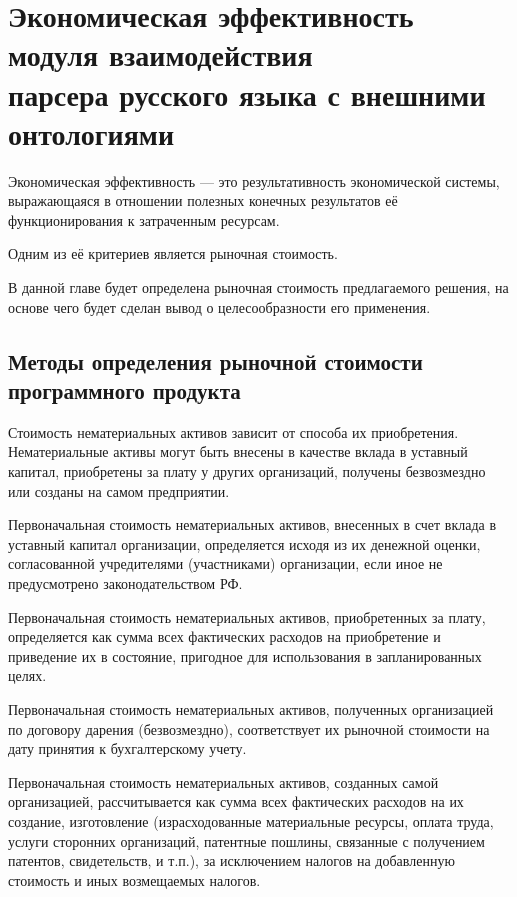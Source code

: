 \indent \section[Экономическая эффективность модуля взаимодействия парсера русского языка с внешними онтологиями]{Экономическая эффективность модуля взаимодействия \\парсера русского языка с внешними онтологиями}

Экономическая эффективность --- это результативность экономической системы, выражающаяся в отношении полезных конечных результатов её функционирования к затраченным ресурсам.

Одним из её критериев является рыночная стоимость.

В данной главе будет определена рыночная стоимость предлагаемого решения, на основе чего будет сделан вывод о целесообразности его применения.

\subsection{Методы определения рыночной стоимости программного продукта}

Стоимость нематериальных активов зависит от способа их приобретения. Нематериальные активы могут быть внесены в качестве вклада в уставный капитал, приобретены за плату у других организаций, получены безвозмездно или созданы на самом предприятии.

Первоначальная стоимость нематериальных активов, внесенных в счет вклада в уставный капитал организации, определяется исходя из их денежной оценки, согласованной учредителями (участниками) организации, если иное не предусмотрено законодательством РФ.

Первоначальная стоимость нематериальных активов, приобретенных за плату, определяется как сумма всех фактических расходов на приобретение и приведение их в состояние, пригодное для использования в запланированных целях. 

Первоначальная стоимость нематериальных активов, полученных организацией по договору дарения (безвозмездно), соответствует их рыночной стоимости на дату принятия к бухгалтерскому учету.

Первоначальная стоимость нематериальных активов, созданных самой организацией, рассчитывается как сумма всех фактических расходов на их создание, изготовление (израсходованные материальные ресурсы, оплата труда, услуги сторонних организаций, патентные пошлины, связанные с получением патентов, свидетельств, и т.п.), за исключением налогов на добавленную стоимость и иных возмещаемых налогов.

